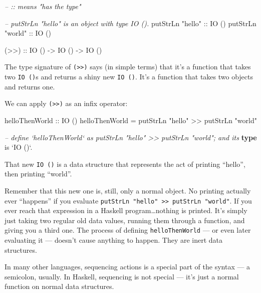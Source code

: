 \documentclass[]{article}
\newenvironment{Shaded}{\begin{snugshade}}{\end{snugshade}}
\newcommand{\CommentTok}[1]{\textcolor[rgb]{0.56,0.35,0.01}{\textit{#1}}}
\newcommand{\DataTypeTok}[1]{\textcolor[rgb]{0.13,0.29,0.53}{#1}}
\newcommand{\FunctionTok}[1]{\textcolor[rgb]{0.00,0.00,0.00}{#1}}
\newcommand{\KeywordTok}[1]{\textcolor[rgb]{0.13,0.29,0.53}{\textbf{#1}}}
\newcommand{\NormalTok}[1]{#1}
\newcommand{\OtherTok}[1]{\textcolor[rgb]{0.56,0.35,0.01}{#1}}
\newcommand{\StringTok}[1]{\textcolor[rgb]{0.31,0.60,0.02}{#1}}
\begin{document}
\begin{Shaded}
\begin{Highlighting}[]
\CommentTok{-- :: means "has the type"}

\CommentTok{-- putStrLn "hello" is an object with type IO ().}
\NormalTok{putStrLn }\StringTok{"hello"}\OtherTok{ ::} \DataTypeTok{IO}\NormalTok{ ()}
\NormalTok{putStrLn }\StringTok{"world"}\OtherTok{ ::} \DataTypeTok{IO}\NormalTok{ ()}

\OtherTok{(>>) ::} \DataTypeTok{IO}\NormalTok{ () }\OtherTok{->} \DataTypeTok{IO}\NormalTok{ () }\OtherTok{->} \DataTypeTok{IO}\NormalTok{ ()}
\end{Highlighting}
\end{Shaded}

The type signature of \texttt{(\textgreater{}\textgreater{})} says (in simple
terms) that it's a function that takes two \texttt{IO\ ()}s and returns a shiny
new \texttt{IO\ ()}. It's a function that takes two objects and returns one.

We can apply \texttt{(\textgreater{}\textgreater{})} as an infix operator:

\begin{Shaded}
\begin{Highlighting}[]
\OtherTok{helloThenWorld ::} \DataTypeTok{IO}\NormalTok{ ()}
\NormalTok{helloThenWorld }\FunctionTok{=}\NormalTok{ putStrLn }\StringTok{"hello"} \FunctionTok{>>}\NormalTok{ putStrLn }\StringTok{"world"}

\CommentTok{-- define `helloThenWorld` as putStrLn "hello" >> putStrLn "world"; and its}
\KeywordTok{type}\NormalTok{ is }\OtherTok{`IO ()`}\FunctionTok{.}
\end{Highlighting}
\end{Shaded}

That new \texttt{IO\ ()} is a data structure that represents the act of printing
``hello'', then printing ``world''.

Remember that this new one is, still, only a normal object. No printing actually
ever ``happens'' if you evaluate
\texttt{putStrLn\ "hello"\ \textgreater{}\textgreater{}\ putStrLn\ "world"}. If
you ever reach that expression in a Haskell program\ldots{}nothing is printed.
It's simply just taking two regular old data values, running them through a
function, and giving you a third one. The process of defining
\texttt{helloThenWorld} --- or even later evaluating it --- doesn't cause
anything to happen. They are inert data structures.

In many other languages, sequencing actions is a special part of the syntax ---
a semicolon, usually. In Haskell, sequencing is not special --- it's just a
normal function on normal data structures.
\end{document}

